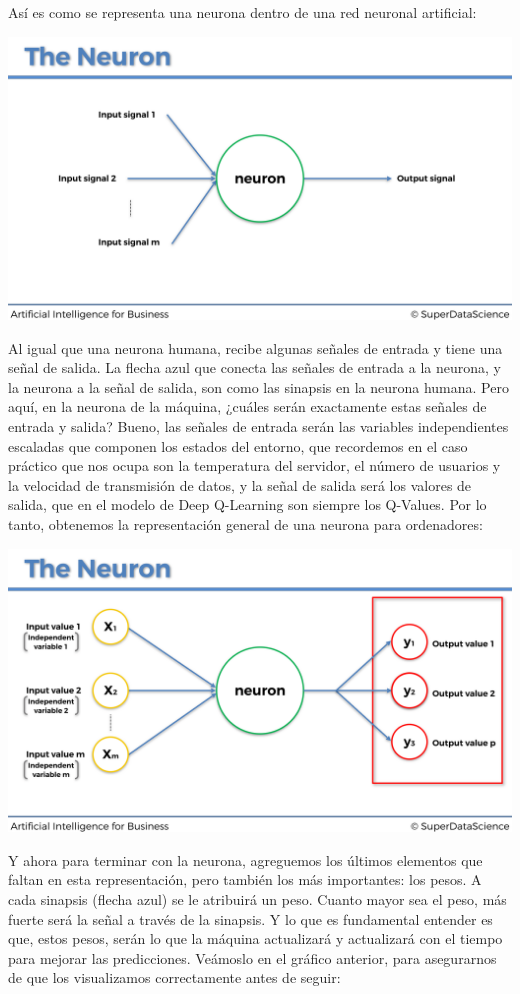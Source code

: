 \documentclass[
]{book}
\begin{document}
Así es como se representa una neurona dentro de una red neuronal artificial:

\includegraphics{Images/ANN_5.png}

Al igual que una neurona humana, recibe algunas señales de entrada y tiene una señal de salida. La flecha azul que conecta las señales de entrada a la neurona, y la neurona a la señal de salida, son como las sinapsis en la neurona humana. Pero aquí, en la neurona de la máquina, ¿cuáles serán exactamente estas señales de entrada y salida? Bueno, las señales de entrada serán las variables independientes escaladas que componen los estados del entorno, que recordemos en el caso práctico que nos ocupa son la temperatura del servidor, el número de usuarios y la velocidad de transmisión de datos, y la señal de salida será los valores de salida, que en el modelo de Deep Q-Learning son siempre los Q-Values. Por lo tanto, obtenemos la representación general de una neurona para ordenadores:

\includegraphics{Images/ANN_7.png}

Y ahora para terminar con la neurona, agreguemos los últimos elementos que faltan en esta representación, pero también los más importantes: los pesos. A cada sinapsis (flecha azul) se le atribuirá un peso. Cuanto mayor sea el peso, más fuerte será la señal a través de la sinapsis. Y lo que es fundamental entender es que, estos pesos, serán lo que la máquina actualizará y actualizará con el tiempo para mejorar las predicciones. Veámoslo en el gráfico anterior, para asegurarnos de que los visualizamos correctamente antes de seguir:
\end{document}
